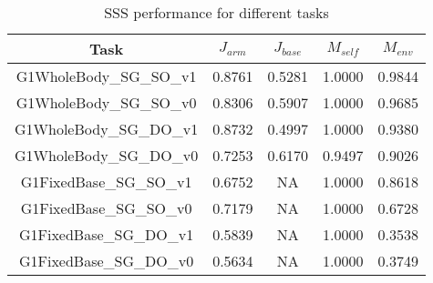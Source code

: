 \begin{table}[ht]
\vspace{0.5cm}

\begin{subtable}[ht]{\textwidth}
    \centering
    \caption{SSS performance for different tasks}
    \label{tb:sss_task_scores}
    \begin{tabular}{c|cccc}
    \toprule
    \textbf{Task} & $J_{arm}$ & $J_{base}$ & $M_{self}$ & $M_{env}$ \\
    \midrule
    G1WholeBody\_SG\_SO\_v1 & 0.8761 & 0.5281 & 1.0000 & 0.9844 \\
    G1WholeBody\_SG\_SO\_v0 & 0.8306 & 0.5907 & 1.0000 & 0.9685 \\
    G1WholeBody\_SG\_DO\_v1 & 0.8732 & 0.4997 & 1.0000 & 0.9380 \\
    G1WholeBody\_SG\_DO\_v0 & 0.7253 & 0.6170 & 0.9497 & 0.9026 \\
    \midrule
    G1FixedBase\_SG\_SO\_v1 & 0.6752 & NA & 1.0000 & 0.8618 \\
    G1FixedBase\_SG\_SO\_v0 & 0.7179 & NA & 1.0000 & 0.6728 \\
    G1FixedBase\_SG\_DO\_v1 & 0.5839 & NA & 1.0000 & 0.3538 \\
    G1FixedBase\_SG\_DO\_v0 & 0.5634 & NA & 1.0000 & 0.3749 \\
    \bottomrule
    \end{tabular}
\end{subtable}


\end{table}




